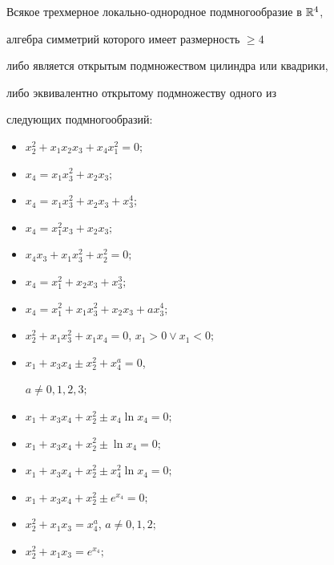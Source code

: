 \begin{thm}\label{t:a}


Всякое трехмерное локально-однородное подмногообразие в $\Bbb R^4$, 


алгебра симметрий которого имеет размерность $\ge 4$


либо является открытым подмножеством цилиндра или квадрики,


либо эквивалентно открытому подмножеству одного из


следующих подмногообразий$:$


\begin{itemize}


\item[$(1)$] $x_2^2+x_1x_2x_3+x_4x_1^2=0;$


\item[$(2)$] $x_4=x_1x_3^2+x_2x_3;$


\item[$(3)$] $x_4=x_1x_3^2+x_2x_3+x_3^4;$


\item[$(4)$] $x_4=x_1^2x_3+x_2x_3;$


\item[$(5)$] $x_4x_3+x_1x_3^2+x_2^2=0;$


\item[$(6)$] $x_4=x_1^2+x_2x_3+x_3^3;$


\item[$(7)$] $x_4=x_1^2+x_1x_3^2+x_2x_3+a x_3^4;$


\item[$(8)$] $x_2^2+x_1x_3^2+x_1x_4=0$, $x_1>0\lor x_1<0;$ 


\item[$(9)$] $x_1+x_3x_4\pm x_2^2+x_4^{a}=0$, 


$a\ne 0,1,2,3;$


\item[$(10)$] $x_1+x_3x_4+ x_2^2\pm x_4\ln x_4=0;$


\item[$(11)$] $x_1+x_3x_4+ x_2^2\pm \ln x_4=0;$


\item[$(12)$] $x_1+x_3x_4+ x_2^2\pm x_4^2\ln x_4=0;$


\item[$(13)$] $x_1+x_3x_4+ x_2^2\pm e^{x_4}=0;$


\item[$(14)$] $x_2^2+x_1x_3=x_4^{a}$, $a\ne 0,1,2;$


\item[$(15)$] $x_2^2+x_1x_3=e^{x_4};$



\end{itemize}
\end{thm}
